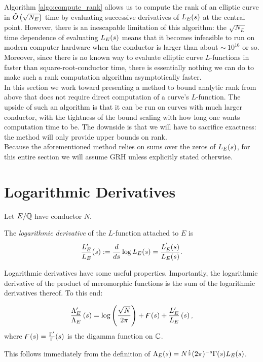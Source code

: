 
Algorithm \ref{algo:compute_rank} allows us to compute the rank of an elliptic curve in $\tilde{O}\left(\sqrt{N_E}\right)$ time by evaluating successive derivatives of $L_E(s)$ at the central point. However, there is an inescapable limitation of this algorithm: the $\sqrt{N_E}$ time dependence of evaluating $L_E(s)$ means that it becomes infeasible to run on modern computer hardware when the conductor is larger than about $\sim~10^{16}$ or so. Moreover, since there is no known way to evaluate elliptic curve $L$-functions in faster than square-root-conductor time, there is essentially nothing we can do to make such a rank computation algorithm asymptotically faster. \\

In this section we work toward presenting a method to bound analytic rank from above that does not require direct computation of a curve's $L$-function. The upside of such an algorithm is that it can be run on curves with much larger conductor, with the tightness of the bound scaling with how long one wants computation time to be. The downside is that we will have to sacrifice exactness: the method will only provide upper bounds on rank. \\

Because the aforementioned method relies on sums over the zeros of $L_E(s)$, for this entire section we will assume GRH unless explicitly stated otherwise.

\section{Logarithmic Derivatives}\label{sec:log_derivs}

Let $E/\mathbb{Q}$  have conductor $N$.
\begin{definition}
The {\it logarithmic derivative} of the $L$-function attached to $E$ is
\begin{equation}
\frac{L_E^{\prime}}{L_E}(s) := \frac{d}{ds} \log L_E(s) = \frac{L_E^{^{\prime}}(s)}{L_E(s)}.
\end{equation}
\end{definition}
Logarithmic derivatives have some useful properties. Importantly, the logarithmic derivative of the product of meromorphic functions is the sum of the logarithmic derivatives thereof. To this end:
\begin{proposition}
\begin{equation}\label{eqn:logderiv_relation}
\frac{\Lambda_E^{\prime}}{\Lambda_E}\left(s\right) = \log\left(\frac{\sqrt{N}}{2\pi}\right) + \digamma(s) + \frac{L_E^{\prime}}{L_E}\left(s\right),
\end{equation}
where $\digamma(s) = \frac{\Gamma^{\prime}}{\Gamma}(s)$ is the digamma function on $\mathbb{C}$.
\end{proposition}
This follows immediately from the definition of $\Lambda_E(s) = N^{\frac{s}{2}}(2\pi)^{-s}\Gamma(s)L_E(s)$. \\

